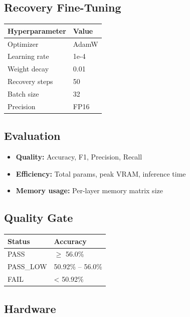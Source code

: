 \subsection{Recovery Fine-Tuning}

\begin{table}[H]
\centering
\small
\begin{tabular}{ll}
\toprule
\textbf{Hyperparameter} & \textbf{Value} \\
\midrule
Optimizer & AdamW \\
Learning rate & 1e-4 \\
Weight decay & 0.01 \\
Recovery steps & 50 \\
Batch size & 32 \\
Precision & FP16 \\
\bottomrule
\end{tabular}
\end{table}

\subsection{Evaluation}

\begin{itemize}
\item \textbf{Quality:} Accuracy, F1, Precision, Recall
\item \textbf{Efficiency:} Total params, peak VRAM, inference time
\item \textbf{Memory usage:} Per-layer memory matrix size

\end{itemize}
\subsection{Quality Gate}

\begin{table}[H]
\centering
\small
\begin{tabular}{ll}
\toprule
\textbf{Status} & \textbf{Accuracy} \\
\midrule
PASS & $\ge$ 56.0\% \\
PASS\_LOW & 50.92\% -- 56.0\% \\
FAIL & \textless{} 50.92\% \\
\bottomrule
\end{tabular}
\end{table}

\subsection{Hardware}

